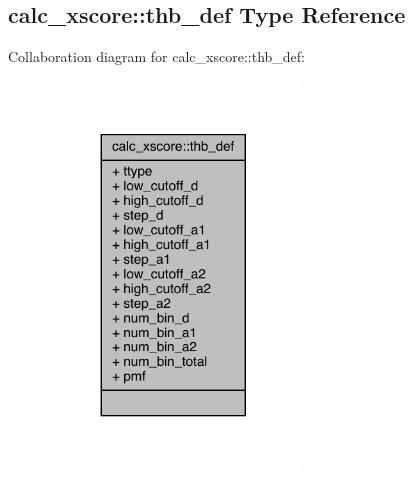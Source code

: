 \hypertarget{structcalc__xscore_1_1thb__def}{\subsection{calc\-\_\-xscore\-:\-:thb\-\_\-def Type Reference}
\label{structcalc__xscore_1_1thb__def}
}


Collaboration diagram for calc\-\_\-xscore\-:\-:thb\-\_\-def\-:
\nopagebreak
\begin{figure}[H]
\begin{center}
\leavevmode
\includegraphics[width=188pt]{structcalc__xscore_1_1thb__def__coll__graph}
\end{center}
\end{figure}
